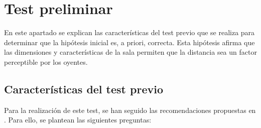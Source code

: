 \documentclass[11pt,a4paper]{book}
\begin{document}
        \section{Test preliminar}
            En este apartado se explican las características del test previo que se realiza para determinar que la hipótesis inicial es, a priori, correcta. Esta hipótesis afirma que las dimensiones y características de la sala permiten que la distancia sea un factor perceptible por los oyentes.
            
            \subsection{Características del test previo}
                Para la realización de este test, se han seguido las recomendaciones propuestas en \cite{Tejada2020}. Para ello, se plantean las siguientes preguntas:
\end{document}
